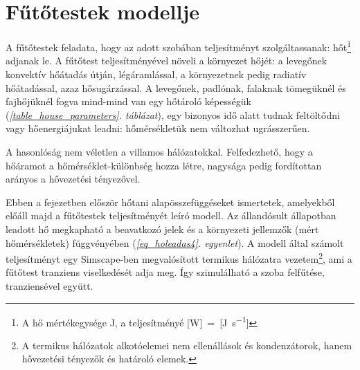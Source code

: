 \chapter{Fűtőtestek modellje}\label{chap:futotest}

A fűtőtestek feladata, hogy az adott szobában teljesítményt szolgáltassanak: hőt\footnote{A hő mértékegysége \si{\joule}, a teljesítményé [\si{\watt}]~=~[\si[per-mode=fraction]{\joule\per\second}]} adjanak le. A fűtőtest teljesítményével növeli a környezet hőjét:
a levegőnek konvektív hőátadás útján, légáramlással, a környezetnek pedig radiatív hőátadással, azaz hősugárzással.
A levegőnek, padlónak, falaknak tömegüknél és fajhőjüknél fogva mind-mind van egy hőtároló képességük (\textit{\ref{table_house_parameters}. táblázat}), egy bizonyos idő alatt tudnak feltöltődni vagy hőenergiájukat leadni: hőmérsékletük nem változhat ugrásszerűen. %

A hasonlóság nem véletlen a villamos hálózatokkal. Felfedezhető, hogy a hőáramot a hőmérséklet-különbség hozza létre, nagysága pedig fordítottan arányos a hővezetési tényezővel. 

Ebben a fejezetben először hőtani alapösszefüggéseket ismertetek, amelyekből előáll majd a fűtőtestek teljesítményét leíró modell. Az állandósult állapotban leadott hő megkapható a beavatkozó jelek és a környezeti jellemzők (mért hőmérsékletek) függvényében (\textit{\ref{eq_holeadas4}. egyenlet}).
A modell által számolt teljesítményt egy Simscape-ben megvalósított termikus hálózatra vezetem\footnote{A termikus hálózatok alkotóelemei nem ellenállások és kondenzátorok, hanem hővezetési tényezők és határoló elemek.}, ami a fűtőtest tranziens viselkedését adja meg. Így szimulálható a szoba felfűtése, tranziensével együtt.






